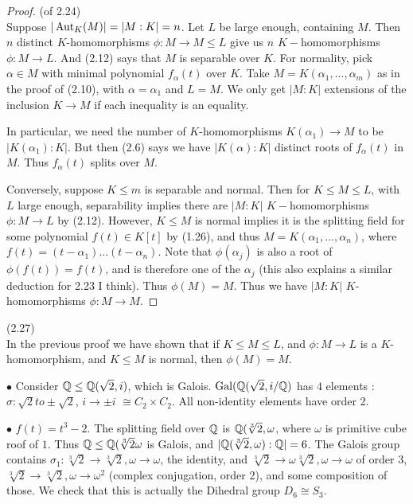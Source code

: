 \documentclass[a4paper]{article}
\begin{document}
\begin{proof} (of 2.24)\\
Suppose $|\operatorname{Aut}_K(M)| = |M:K| = n$. Let $L$ be large enough, containing $M$. Then $n$ distinct $K$-homomorphisms $\phi: M \to M \leq L$ give us $n$ $K-$homomorphisms $\phi:M \to L$. And (2.12) says that $M$ is separable over $K$. For normality, pick $\alpha \in M$ with minimal polynomial $f_\alpha(t)$ over $K$. Take $M=K(\alpha_1,...,\alpha_m)$ as in the proof of (2.10), with $\alpha = \alpha_1$ and $L=M$. We only get $|M:K|$ extensions of the inclusion $K \to M$ if each inequality is an equality.

In particular, we need the number of $K$-homomorphisms $K(\alpha_1) \to M$ to be $|K(\alpha_1):K|$. But then (2.6) says we have $|K(\alpha):K|$ distinct roots of $f_\alpha(t)$ in $M$. Thus $f_\alpha(t)$ splits over $M$.

Conversely, suppose $K \leq m$ is separable and normal. Then for $K \leq M \leq L$, with $L$ large enough, separability implies there are $|M:K|$ $K-$homomorphisms $\phi: M \to L$ by (2.12). However, $K \leq M$ is normal implies it is the splitting field for some polynomial $f(t) \in K[t]$ by (1.26), and thus $M = K(\alpha_1,...,\alpha_n)$, where $f(t) = (t-\alpha_1)...(t-\alpha_n)$. Note that $\phi(\alpha_j)$ is also a root of $\phi(f(t)) = f(t)$, and is therefore one of the $\alpha_j$ (this also explains a similar deduction for 2.23 I think). Thus $\phi(M) = M$. Thus we have $|M:K|$ $K$-homomorphisms $\phi:M \to M$.
\end{proof}

\begin{rem} (2.27)\\
In the previous proof we have shown that if $K \leq M \leq L$, and $\phi: M \to L$ is a $K$-homomorphism, and $K \leq M$ is normal, then $\phi(M) = M$.
\end{rem}

\begin{eg}
$\bullet$ Consider $\mathbb{Q} \leq \mathbb{Q}(\sqrt{2},i)$, which is Galois. $\operatorname{Gal}(\mathbb{Q}(\sqrt{2},i/\mathbb{Q})$ has $4$ elements : $\sigma : \sqrt{2} to \pm \sqrt{2}$, $i \to \pm i$ $\cong C_2 \times C_2$. All non-identity elements have order 2.

$\bullet$ $f(t) = t^3-2$. The splitting field over $\mathbb{Q}$ is $\mathbb{Q}(\sqrt[3]{2},\omega$, where $\omega$ is primitive cube roof of $1$. Thus $\mathbb{Q} \leq \mathbb{Q}(\sqrt[3]{2} \omega$ is Galois, and $|\mathbb{Q}(\sqrt[3]{2},\omega):\mathbb{Q}| = 6$. The Galois group contains $\sigma_1:\sqrt[3]{2} \to \sqrt[3]{2}, \omega \to \omega$, the identity,  and $\sqrt[3]{2} \to \omega \sqrt[3]{2}, \omega \to \omega$ of order $3$, $\sqrt[3]{2} \to \sqrt[3]{2}, \omega \to \omega^2$ (complex conjugation, order 2), and some composition of those. We check that this is actually the Dihedral group $D_6 \cong S_3$.
\end{eg}
\end{document}
